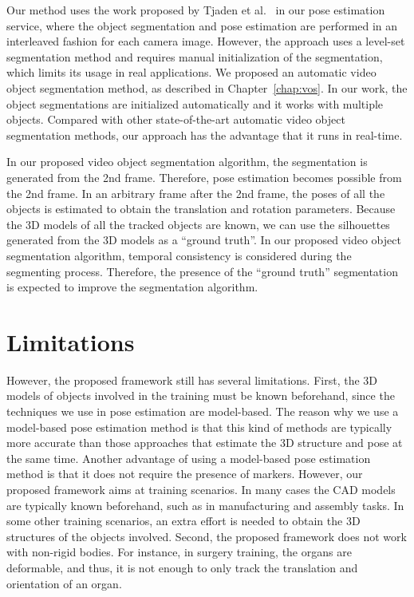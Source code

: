 Our method uses the work proposed by Tjaden et al.~\cite{tjaden2016} in our pose estimation service, where the object segmentation and pose estimation are performed in an interleaved fashion for each camera image.
However, the approach uses a level-set segmentation method and requires manual initialization of the segmentation, which limits its usage in real applications.
We proposed an automatic video object segmentation method, as described in Chapter~\ref{chap:vos}. In our work, the object segmentations are initialized automatically and it works with multiple objects.
Compared with other state-of-the-art automatic video object segmentation methods, our approach has the advantage that it runs in real-time.

In our proposed video object segmentation algorithm, the segmentation is generated from the 2nd frame. Therefore, pose estimation becomes possible from the 2nd frame.
In an arbitrary frame after the 2nd frame, the poses of all the objects is estimated to obtain the translation and rotation parameters. Because the 3D models of all the tracked objects are known, we can use the silhouettes generated from the 3D models as a ``ground truth''.
In our proposed video object segmentation algorithm, temporal consistency is considered during the segmenting process. Therefore, the presence of the ``ground truth'' segmentation is expected to improve the segmentation algorithm.

\section{Limitations}
\label{sec:dm:l}

However, the proposed framework still has several limitations.
First, the 3D models of objects involved in the training must be known beforehand, since the techniques we use in pose estimation are model-based.
The reason why we use a model-based pose estimation method is that this kind of methods are typically more accurate than those approaches that estimate the 3D structure and pose at the same time. Another advantage of using a model-based pose estimation method is that it does not require the presence of markers.
However, our proposed framework aims at training scenarios. In many cases the CAD models are typically known beforehand, such as in manufacturing and assembly tasks.
In some other training scenarios, an extra effort is needed to obtain the 3D structures of the objects involved.
Second, the proposed framework does not work with non-rigid bodies.
For instance, in surgery training, the organs are deformable, and thus, it is not enough to only track the translation and orientation of an organ.
